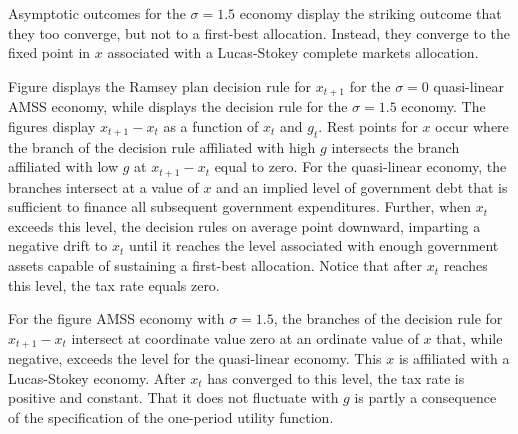 Asymptotic outcomes  for the $\sigma = 1.5$ economy display the striking outcome that they too converge, but not to a first-best allocation.  Instead, they converge to the
fixed point in $x$  associated with a Lucas-Stokey complete markets allocation.

Figure  displays the Ramsey plan decision rule for $x_{t+1}$  for the $\sigma=0$ quasi-linear AMSS economy,  while  displays
 the decision rule for the $\sigma =1.5$ economy.  The figures display $x_{t+1} - x_t$ as a function of $x_t$ and $g_t$.   Rest points  for $x$ occur where the branch of
the decision rule affiliated with  high $g$ intersects the branch affiliated with low $g$ at  $x_{t+1} - x_t$ equal to zero.
For the quasi-linear economy, the branches intersect at a value of  $x$ and an implied
level of government debt that is sufficient to finance all subsequent government expenditures. Further, when
$x_t$ exceeds this level,  the decision rules on average point downward, imparting a negative drift to $x_t$ until it reaches the level associated with enough
government assets capable of sustaining a first-best allocation.  Notice that after $x_t$ reaches this level,  the tax rate equals zero.


For the figure  AMSS economy with $\sigma=1.5$, the branches of the decision rule for $x_{t+1} -x_t$ intersect at coordinate  value  zero at an ordinate value of $x$ that,
while negative, exceeds the
level for the quasi-linear  economy.  This $x$ is affiliated with a Lucas-Stokey economy.  After $x_t$ has converged to this level,
the tax rate is positive and constant. That it does not fluctuate
with $g$ is partly a consequence of the specification of the one-period utility function.
